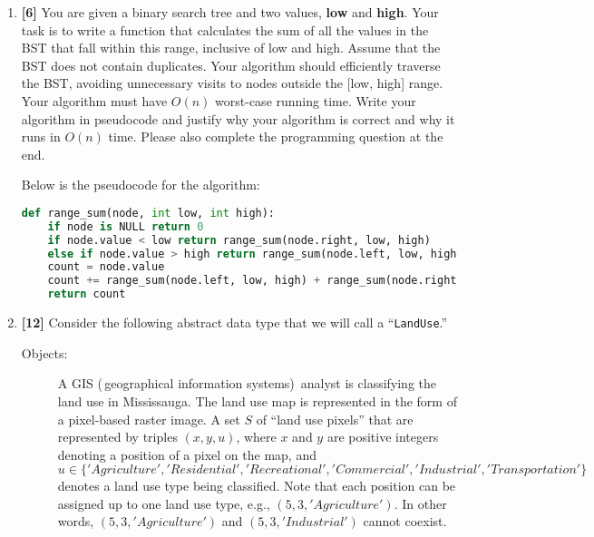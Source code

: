 \documentclass{assignment-263}
\begin{document}
\think
\begin{enumerate}
\item \textbf{[6]}
    You are given a binary search tree and two values, \textbf{low} and \textbf{high}. Your task 
    is to write a function that calculates the sum of all the values in the BST that fall within this
    range, inclusive of low and high. Assume that the BST does not contain duplicates. Your 
    algorithm should efficiently traverse the BST, avoiding unnecessary visits to nodes outside
    the [low, high] range. 
    Your algorithm must have $O(n)$ worst-case running time.
    Write your algorithm in pseudocode and justify why your algorithm is correct and why it runs 
    in $O(n)$ time. Please also complete the programming question at the end.

	Below is the pseudocode for the algorithm:
	\begin{lstlisting}[language=Python]
def range_sum(node, int low, int high):
	if node is NULL return 0
	if node.value < low return range_sum(node.right, low, high)
	else if node.value > high return range_sum(node.left, low, high)
	count = node.value
	count += range_sum(node.left, low, high) + range_sum(node.right, low, high)
	return count
	\end{lstlisting}


\item \textbf{[12]}
    Consider the following abstract data type that we will call a
		``\texttt{LandUse}.''
		\begin{description}
		\item[Objects:]
				A GIS (\,geographical information systems)\, analyst is 
				classifying the land use in Mississauga.
				The land use map is represented in the form of a  
				pixel-based raster image. 
				A set $S$ of ``land use pixels'' that are represented by
				triples $(x, y, u)$, where $x$ and $y$ are positive
				integers denoting a position of a pixel on the map, and
				$u\in\{'Agriculture', 'Residential', 'Recreational',
				'Commercial', 'Industrial', 'Transportation'\}$ denotes 
				a land use type being classified. Note that each position
				can be assigned up to one land use type, e.g., 
				$(5, 3, 'Agriculture')$. In other words, $(5, 3, 'Agriculture')$ 
				and $(5, 3, 'Industrial')$ cannot coexist. 


\end{description}
\end{enumerate}
\end{document}
